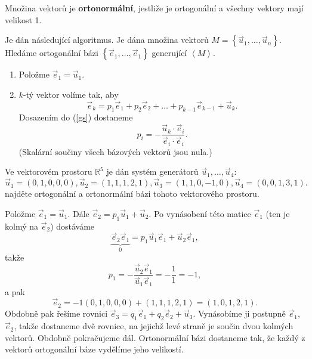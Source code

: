 \begin{definition}
    Množina vektorů je \textbf{ortonormální}, jestliže je ortogonální a všechny vektory mají
    velikost 1.
\end{definition}

\begin{veta}
    Je dán následující algoritmus.
    Je dána množina vektorů $M=\left \{ \vec u_1,\dots, \vec u_n \right \}$.\\
    Hledáme ortogonální bázi $\left \{ \vec e_1, \dots, \vec e_1 \right \}$
    generující $\left < M \right >.$
    \begin{enumerate}[1.]
    \item Položme $\vec e_1 = \vec u_1.$
   	\item $k$-tý vektor volíme tak, aby
    \begin{equation}\label{gs}
    \vec e_k = p_1\vec e_1 + p_2\vec e_2 + \dots +p_{k-1} \vec e_{k-1} + \vec u_k.
    \end{equation}
    Dosazením do (\ref{gs}) dostaneme
    $$p_i = -\frac{\vec u_k\cdot \vec e_i}{\vec e_i\cdot \vec e_i}.$$
    (Skalární součiny všech bázových vektorů jsou nula.)
    \end{enumerate}
\end{veta}

\begin{priklad}
Ve vektorovém prostoru $\mathbb R^5$ je dán systém generátorů $\vec u_1,\dots,\vec u_4$:
$$
    \vec u_1 = (0,1,0,0,0), \vec u_2 = (1,1,1,2,1), \vec u_3 = (1,1,0,-1,0), \vec u_4 = (0,0,1,3,1).
$$
najděte ortogonální a ortonormální bázi tohoto vektorového prostoru.
\end{priklad}

\begin{reseni}
Položme $\vec e_1=\vec u_1.$ Dále $\vec e_2 = p_1\vec u_1 + \vec u_2$. Po vynásobení
této matice $\vec e_1$ (ten je kolmý na $\vec e_2$) dostáváme
$$\underbrace{\vec e_2 \vec e_1}_{0}=p_1\vec u_1\vec e_1+\vec u_2\vec e_1,$$
takže
$$p_1=-\frac{\vec u_2\vec e_1}{\vec u_1\vec e_1} = -\frac{1}{1}=-1,$$
a pak
$$\vec e_2 = -1(0,1,0,0,0)+(1,1,1,2,1)=(1,0,1,2,1).$$
Obdobně pak řešíme rovnici $\vec e_3=q_1\vec e_1 + q_2\vec e_2 + \vec u_3$. Vynásobíme
ji postupně $\vec e_1$, $\vec e_2$, takže dostaneme dvě rovnice, na jejichž levé straně
je součin dvou kolmých vektorů. Obdobně pokračujeme dál. Ortonormální bázi
dostaneme tak, že každý z vektorů ortogonální báze vydělíme jeho velikostí.
\end{reseni}

